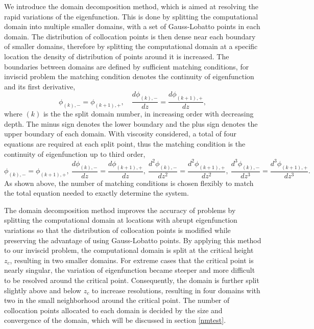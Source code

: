 We introduce the domain decomposition method, which is aimed at resolving the rapid variations of the eigenfunction. This is done by splitting the computational domain into multiple smaller domains, with a set of Gauss-Lobatto points in each domain. The distribution of collocation points is then dense near each boundary of smaller domains, therefore by splitting the computational domain at a specific location the density of distribution of points around it is increased. The boundaries between domains are defined by sufficient matching conditions, for inviscid problem the matching condition denotes the continuity of eigenfunction and its first derivative,
\begin{equation}
    \phi _{( k) ,-} =\phi _{( k+1) ,+} ,\quad \frac{d\phi _{( k) ,-}}{dz} =\frac{d\phi _{( k+1) ,+}}{dz},
\end{equation}
where $(k)$ is the the split domain number, in increasing order with decreasing depth. The minus sign denotes the lower boundary and the plus sign denotes the upper boundary of each domain. With viscosity considered, a total of four equations are required at each split point, thus the matching condition is the continuity of eigenfunction up to third order,
\begin{equation}
\phi _{( k) ,-} =\phi _{( k+1) ,+} ,\ \frac{d\phi _{( k) ,-}}{dz} =\frac{d\phi _{( k+1) ,+}}{dz} ,\ \frac{d^{2}\phi _{( k) ,-}}{dz^{2}} =\frac{d^{2}\phi _{( k+1) ,+}}{dz^{2}} ,\ \frac{d^{3}\phi _{( k) ,-}}{dz^{3}} =\frac{d^{3}\phi _{( k+1) ,+}}{dz^{3}}.
\end{equation}
As shown above, the number of matching conditions is chosen flexibly to match the total equation needed to exactly determine the system.

The domain decomposition method improves the accuracy of problems by splitting the computational domain at locations with abrupt eigenfunction variations so that the distribution of collocation points is modified while preserving the advantage of using Gauss-Lobatto points. By applying this method to our inviscid problem, the computational domain is split at the critical height $z_c$, resulting in two smaller domains. For extreme cases that the critical point is nearly singular, the variation of eigenfunction became steeper and more difficult to be resolved around the critical point. Consequently, the domain is further split slightly above and below $z_c$ to increase resolutions, resulting in four domains with two in the small neighborhood around the critical point. The number of collocation points allocated to each domain is decided by the size and convergence of the domain, which will be discussed in section \ref{nmtest}.

